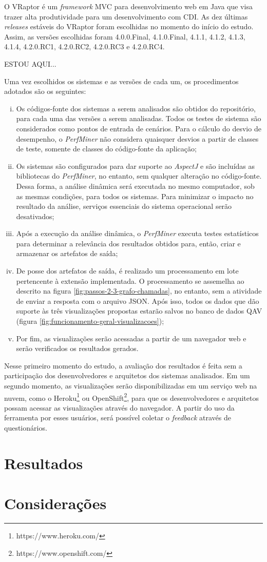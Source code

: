 O VRaptor é um \textit{framework} MVC para desenvolvimento web em Java que visa trazer alta produtividade para um desenvolvimento com CDI. As dez últimas \textit{releases} estáveis do VRaptor foram escolhidas no momento do início do estudo. Assim, as versões escolhidas foram 4.0.0.Final, 4.1.0.Final, 4.1.1, 4.1.2, 4.1.3, 4.1.4, 4.2.0.RC1, 4.2.0.RC2, 4.2.0.RC3 e 4.2.0.RC4.

{\color{red}ESTOU AQUI...}

Uma vez escolhidos os sistemas e as versões de cada um, os procedimentos adotados são os seguintes:
\begin{enumerate}[(i)]
	\item Os códigos-fonte dos sistemas a serem analisados são obtidos do repositório, para cada uma das versões a serem analisadas. Todos os testes de sistema são considerados como pontos de entrada de cenários. Para o cálculo do desvio de desempenho, o \textit{PerfMiner} não considera quaisquer desvios a partir de classes de teste, somente de classes do código-fonte da aplicação;
	\item Os sistemas são configurados para dar suporte ao \textit{AspectJ} e são incluídas as bibliotecas do \textit{PerfMiner}, no entanto, sem qualquer alteração no código-fonte. Dessa forma, a análise dinâmica será executada no mesmo computador, sob as mesmas condições, para todos os sistemas. Para minimizar o impacto no resultado da análise, serviços essenciais do sistema operacional serão desativados;
	\item Após a execução da análise dinâmica, o \textit{PerfMiner} executa testes estatísticos para determinar a relevância dos resultados obtidos para, então, criar e armazenar os artefatos de saída;
	\item De posse dos artefatos de saída, é realizado um processamento em lote pertencente à extensão implementada. O processamento se assemelha ao descrito na figura \ref{fig:passos-2-3-grafo-chamadas}, no entanto, sem a atividade de enviar a resposta com o arquivo JSON. Após isso, todos os dados que dão suporte às três visualizações propostas estarão salvos no banco de dados QAV (figura \ref{fig:funcionamento-geral-visualizacoes});
	\item Por fim, as visualizações serão acessadas a partir de um navegador web e serão verificados os resultados gerados.
\end{enumerate}

Nesse primeiro momento do estudo, a avaliação dos resultados é feita sem a participação dos desenvolvedores e arquitetos dos sistemas analisados. Em um segundo momento, as visualizações serão disponibilizadas em um serviço web na nuvem, como o Heroku\footnote{https://www.heroku.com/} ou OpenShift\footnote{https://www.openshift.com/}, para que os desenvolvedores e arquitetos possam acessar as visualizações através do navegador. A partir do uso da ferramenta por esses usuários, será possível coletar o \textit{feedback} através de questionários.

\section{Resultados} \label{sec:avaliacao-resultados}
\section{Considerações} \label{sec:avaliacao-consideracoes}